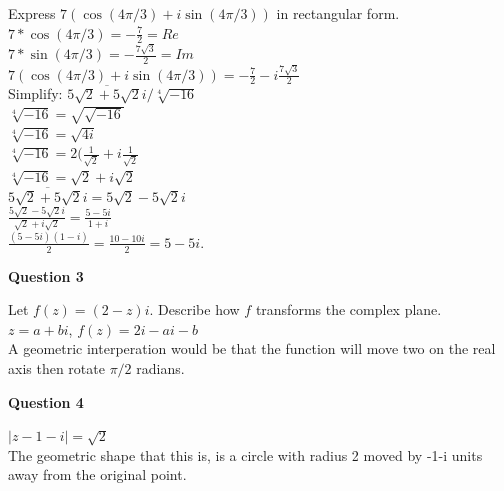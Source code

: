 \documentclass[12pt]{article}
\begin{document}
 Express $7(\cos(4\pi/3) + i\sin(4\pi/3))$ in rectangular form. \\

$7 * \cos(4\pi/3) = -\frac{7}{2} = Re$\\
$7 * \sin(4\pi/3) = -\frac{7\sqrt{3}}{2} = Im$\\

$7(\cos(4\pi/3) + i\sin(4\pi/3)) = -\frac{7}{2} - i\frac{7\sqrt{3}}{2}$\\ 


 Simplify: $\overline{5\sqrt{2} + 5\sqrt{2}i}/\sqrt[4]{-16}$ \\

$\sqrt[4]{-16} = \sqrt{\sqrt{-16}}$\\
$\sqrt[4]{-16} = \sqrt{4i}$\\
$\sqrt[4]{-16} = 2(\frac{1}{\sqrt{2}} + i\frac{1}{\sqrt{2}}$\\
$\sqrt[4]{-16} = \sqrt{2} + i\sqrt{2}$\\

$\overline{5\sqrt{2} + 5\sqrt{2}i} = 5\sqrt{2} - 5\sqrt{2}i$\\

$\frac{5\sqrt{2}-5\sqrt{2}i}{\sqrt{2} + i \sqrt{2}} = \frac{5-5i}{1 + i}$\\

$\frac{(5-5i)(1-i)}{2} = \frac{10-10i}{2} = 5 - 5i$.\\

\begin{center}
\textbf{\large Question 3}
\end{center}

Let $f(z) = (2 - z)i$. Describe how $f$ transforms the complex plane.\\

$z = a + bi$, $f(z) = 2i - ai - b$\\

A geometric interperation would be that the function will move two on the real axis then rotate $\pi/2$ radians. 


\begin{center}
\textbf{\large Question 4}
\end{center}


 $|z - 1 - i| = \sqrt{2}$ \\

The geometric shape that this is, is a circle with radius 2 moved by -1-i units away from the original point.\\
\end{document}
